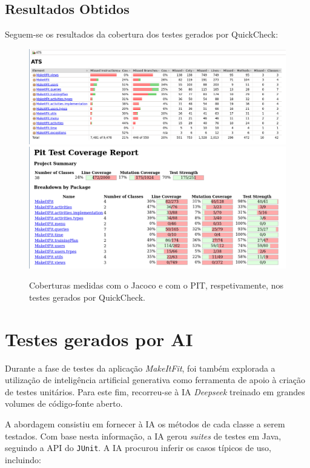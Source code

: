 \documentclass[12pt, a4paper]{article}
\begin{document}
\subsection{Resultados Obtidos}

Seguem-se os resultados da cobertura dos testes gerados por QuickCheck:

\begin{figure}[H]
    \includegraphics[width=\textwidth]{res/QuickCheckJacoco.png}
    \includegraphics[width=\textwidth]{res/QuickCheckPit.png}
    \caption{Coberturas medidas com o Jacoco e com o PIT, respetivamente, nos testes gerados por QuickCheck.}
\end{figure}

\section{Testes gerados por AI}

Durante a fase de testes da aplicação \textit{MakeItFit}, foi também explorada a utilização de
inteligência artificial generativa como ferramenta de apoio à criação de testes unitários. Para este
fim, recorreu-se à IA \textit{Deepseek} treinado em grandes volumes de código-fonte aberto.

A abordagem consistiu em fornecer à IA os métodos de cada classe a serem testados. Com base nesta
informação, a IA gerou \emph{suites} de testes em Java, seguindo a API do \texttt{JUnit}. A IA
procurou inferir os casos típicos de uso, incluindo:
\end{document}
